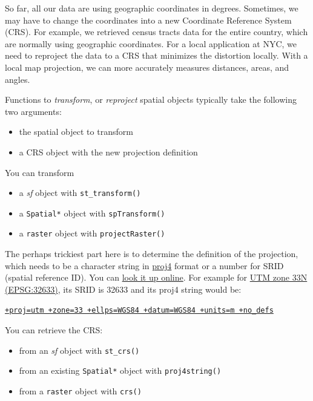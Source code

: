\documentclass[
  11pt,
]{book}
\providecommand{\tightlist}{%
  \setlength{\itemsep}{0pt}\setlength{\parskip}{0pt}}
\begin{document}
So far, all our data are using geographic coordinates in degrees. Sometimes, we may have to change the coordinates into a new Coordinate Reference System (CRS). For example, we retrieved census tracts data for the entire country, which are normally using geographic coordinates. For a local application at NYC, we need to reproject the data to a CRS that minimizes the distortion locally. With a local map projection, we can more accurately measures distances, areas, and angles.

Functions to \emph{transform}, or \emph{reproject} spatial objects typically take the following two arguments:

\begin{itemize}
\tightlist
\item
  the spatial object to transform
\item
  a CRS object with the new projection definition
\end{itemize}

You can transform

\begin{itemize}
\tightlist
\item
  a \emph{sf} object with \texttt{st\_transform()}\\
\item
  a \texttt{Spatial*} object with \texttt{spTransform()}\\
\item
  a \texttt{raster} object with \texttt{projectRaster()}
\end{itemize}

The perhaps trickiest part here is to determine the definition of the projection, which needs to be a character string in \href{http://trac.osgeo.org/proj/}{proj4} format or a number for SRID (spatial reference ID). You can \href{http://www.spatialreference.org}{look it up online}. For example for \href{http://spatialreference.org/ref/epsg/wgs-84-utm-zone-33n/}{UTM zone 33N (EPSG:32633)}, its SRID is 32633 and its proj4 string would be:

\href{http://spatialreference.org/ref/epsg/wgs-84-utm-zone-33n/proj4js/}{\texttt{+proj=utm\ +zone=33\ +ellps=WGS84\ +datum=WGS84\ +units=m\ +no\_defs}}

You can retrieve the CRS:

\begin{itemize}
\tightlist
\item
  from an \emph{sf} object with \texttt{st\_crs()}
\item
  from an existing \texttt{Spatial*} object with \texttt{proj4string()}
\item
  from a \texttt{raster} object with \texttt{crs()}
\end{itemize}
\end{document}

